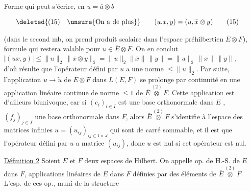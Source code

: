  Forme qui peut s'écrire, en    $u=\bar a\otimes b$


\[
\deleted{(15)\quad\text{\unsure{On a de plus}}}\qquad (u.x,y)=(u,\bar x\otimes y) \tag*{(15)}
\]

 
(dans le second mb, on prend  produit scalaire
dans l'espace préhilbertien $\bar E\otimes F$), formule qui
restera valable  pour  $u\in\bar E\otimes F$. On en
conclut  $|(ux,y)|\leq\|u\|_2\,\|\bar x\otimes y\|_2=\|u\|_2\|\bar x\|\,\|y\|
=\|u\|_2\,\|x\|\,\|y\|$, d'où résulte que l'opérateur
défini par $u$ a une norme $\leq\|u\|_2$. Par
suite, l'application $u\to\tilde u$ de $\bar E\otimes F$ dans $L(E,F)$
se prolonge par continuité en une application linéaire
continue de  norme $\leq 1$ de $\bar E\overset{(2)}{\otimes}F$. Cette
application est d'ailleurs biunivoque, car si $(e_i)_{i\in I}$ est
une base orthonormale dans $E$ , $(f_j)_{j\in J}$ une base
orthonormale dans $F$, alors $\bar E\overset{(2)}{\otimes}F$ s'identifie
à l'espace  des matrices infinies
$u=(u_{ij})_{ij\in I\times J}$ qui sont de carré sommable,  et
il est   que l'opérateur  défini par $u$
a   matrice $(u_{ij})$, donc $u$ est nul si cet
opérateur est nul. 

\uline{Définition 2} Soient $E$ et $F$ deux espaces de Hilbert.
On appelle op. de H.-S. de $E$ dans $F$,   applications
linéaires de $E$ dans $F$ définies par des éléments
de $\bar E\overset{(2)}{\otimes} F$. L'esp. de ces op.,  muni de la structure

